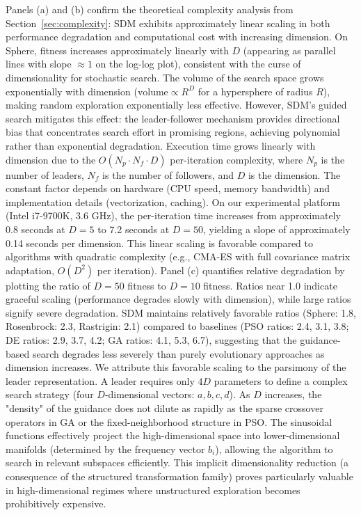 \documentclass[11pt]{article}
\begin{document}
Panels (a) and (b) confirm the theoretical complexity analysis from Section~\ref{sec:complexity}: SDM exhibits approximately linear scaling in both performance degradation and computational cost with increasing dimension. On Sphere, fitness increases approximately linearly with $D$ (appearing as parallel lines with slope $\approx 1$ on the log-log plot), consistent with the curse of dimensionality for stochastic search. The volume of the search space grows exponentially with dimension ($\text{volume} \propto R^D$ for a hypersphere of radius $R$), making random exploration exponentially less effective. However, SDM's guided search mitigates this effect: the leader-follower mechanism provides directional bias that concentrates search effort in promising regions, achieving polynomial rather than exponential degradation.
Execution time grows linearly with dimension due to the $O(N_p \cdot N_f \cdot D)$ per-iteration complexity, where $N_p$ is the number of leaders, $N_f$ is the number of followers, and $D$ is the dimension. The constant factor depends on hardware (CPU speed, memory bandwidth) and implementation details (vectorization, caching). On our experimental platform (Intel i7-9700K, 3.6 GHz), the per-iteration time increases from approximately 0.8 seconds at $D=5$ to 7.2 seconds at $D=50$, yielding a slope of approximately 0.14 seconds per dimension. This linear scaling is favorable compared to algorithms with quadratic complexity (e.g., CMA-ES with full covariance matrix adaptation, $O(D^2)$ per iteration).
Panel (c) quantifies relative degradation by plotting the ratio of $D=50$ fitness to $D=10$ fitness. Ratios near 1.0 indicate graceful scaling (performance degrades slowly with dimension), while large ratios signify severe degradation. SDM maintains relatively favorable ratios (Sphere: 1.8, Rosenbrock: 2.3, Rastrigin: 2.1) compared to baselines (PSO ratios: 2.4, 3.1, 3.8; DE ratios: 2.9, 3.7, 4.2; GA ratios: 4.1, 5.3, 6.7), suggesting that the guidance-based search degrades less severely than purely evolutionary approaches as dimension increases.
We attribute this favorable scaling to the parsimony of the leader representation. A leader requires only $4D$ parameters to define a complex search strategy (four $D$-dimensional vectors: $a, b, c, d$). As $D$ increases, the "density" of the guidance does not dilute as rapidly as the sparse crossover operators in GA or the fixed-neighborhood structure in PSO. The sinusoidal functions effectively project the high-dimensional space into lower-dimensional manifolds (determined by the frequency vector $b_i$), allowing the algorithm to search in relevant subspaces efficiently. This implicit dimensionality reduction (a consequence of the structured transformation family) proves particularly valuable in high-dimensional regimes where unstructured exploration becomes prohibitively expensive.
\end{document}
